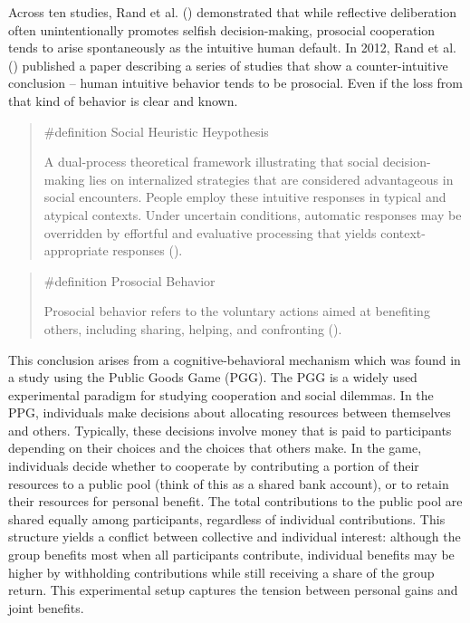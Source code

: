 \documentclass[
  letterpaper,
]{book}
\begin{document}
Across ten studies, Rand et al.
() demonstrated that while
reflective deliberation often unintentionally promotes selfish
decision-making, prosocial cooperation tends to arise spontaneously as
the intuitive human default. In 2012, Rand et al.
() published a paper
describing a series of studies that show a counter-intuitive conclusion
-- human intuitive behavior tends to be prosocial. Even if the loss from
that kind of behavior is clear and known.

\begin{quote}
\label{def-socialheuristic}{\#definition} Social
Heuristic Heypothesis

A dual-process theoretical framework illustrating that social
decision-making lies on internalized strategies that are considered
advantageous in social encounters. People employ these intuitive
responses in typical and atypical contexts. Under uncertain conditions,
automatic responses may be overridden by effortful and evaluative
processing that yields context-appropriate responses
().
\end{quote}

\begin{quote}
\label{def-prosocial}{\#definition} Prosocial Behavior

Prosocial behavior refers to the voluntary actions aimed at benefiting
others, including sharing, helping, and confronting
().
\end{quote}

This conclusion arises from a cognitive-behavioral mechanism which was
found in a study using the Public Goods Game (PGG). The PGG is a widely
used experimental paradigm for studying cooperation and social dilemmas.
In the PPG, individuals make decisions about allocating resources
between themselves and others. Typically, these decisions involve money
that is paid to participants depending on their choices and the choices
that others make. In the game, individuals decide whether to cooperate
by contributing a portion of their resources to a public pool (think of
this as a shared bank account), or to retain their resources for
personal benefit. The total contributions to the public pool are shared
equally among participants, regardless of individual contributions. This
structure yields a conflict between collective and individual interest:
although the group benefits most when all participants contribute,
individual benefits may be higher by withholding contributions while
still receiving a share of the group return. This experimental setup
captures the tension between personal gains and joint benefits.
\end{document}
